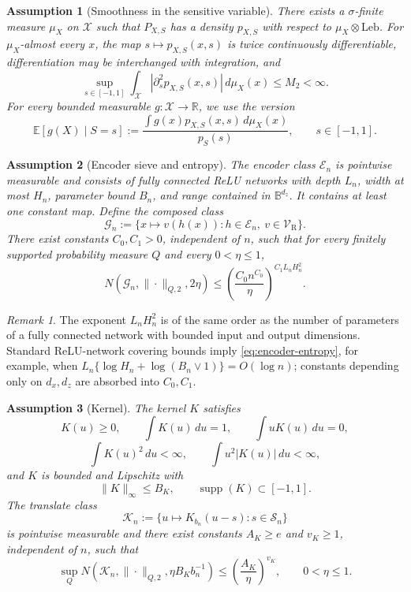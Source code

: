 \documentclass[11pt]{article}
\newtheorem{assumption}{Assumption}[section]
\theoremstyle{remark}
\newtheorem{remark}{Remark}[section]
\newcommand{\R}{\mathbb{R}}
\newcommand{\E}{\mathbb{E}}
\newcommand{\cX}{\mathcal{X}}
\newcommand{\cS}{\mathcal{S}}
\newcommand{\cV}{\mathcal{V}}
\newcommand{\cG}{\mathcal{G}}
\newcommand{\cE}{\mathscr{E}}
\newcommand{\cK}{\mathcal{K}}
\newcommand{\cB}{\mathbb{B}}
\begin{document}
\begin{assumption}[Smoothness in the sensitive variable]
\label{ass:smooth-density}
There exists a $\sigma$-finite measure $\mu_X$ on $\cX$ such that $P_{X,S}$ has
a density $p_{X,S}$ with respect to $\mu_X\otimes\mathrm{Leb}$.  For
$\mu_X$-almost every $x$, the map $s\mapsto p_{X,S}(x,s)$ is twice continuously
differentiable, differentiation may be interchanged with integration, and
\[
  \sup_{s\in[-1,1]}
  \int_{\cX}
  \left|\partial_s^2p_{X,S}(x,s)\right|\,d\mu_X(x)
  \le M_2<\infty.
  \label{eq:density-smoothness}
\]
For every bounded measurable $g:\cX\to\R$, we use the version
\[
  \E[g(X)\mid S=s]
  :=
  \frac{\int g(x)p_{X,S}(x,s)\,d\mu_X(x)}{p_S(s)},
  \qquad s\in[-1,1].
\]
\end{assumption}

\begin{assumption}[Encoder sieve and entropy]
\label{ass:encoder-entropy}
The encoder class $\cE_n$ is pointwise measurable and consists of fully
connected ReLU networks with depth $L_n$, width at most $H_n$, parameter bound
$B_n$, and range contained in $\cB^{d_z}$.  It contains at least one constant
map.  Define the composed class
\[
  \cG_n
  :=
  \{x\mapsto v(h(x)):h\in\cE_n,\ v\in\cV_{\mathrm{R}}\}.
\]
There exist constants $C_0,C_1>0$, independent of $n$, such that for every
finitely supported probability measure $Q$ and every $0<\eta\le1$,
\begin{equation}
  N\!\left(
    \cG_n,\|\cdot\|_{Q,2},2\eta
  \right)
  \le
  \left(\frac{C_0n^{C_0}}{\eta}\right)^{C_1L_nH_n^2}.
  \label{eq:encoder-entropy}
\end{equation}
\end{assumption}

\begin{remark}
The exponent $L_nH_n^2$ is of the same order as the number of parameters of a
fully connected network with bounded input and output dimensions.  Standard
ReLU-network covering bounds imply \eqref{eq:encoder-entropy}, for example, when
$L_n\{\log H_n+\log(B_n\vee1)\}=O(\log n)$; constants depending only on
$d_x,d_z$ are absorbed into $C_0,C_1$.
\end{remark}

\begin{assumption}[Kernel]
\label{ass:kernel}
The kernel $K$ satisfies
\[
  K(u)\ge0,\qquad
  \int K(u)\,du=1,\qquad
  \int uK(u)\,du=0,
\]
\[
  \int K(u)^2\,du<\infty,
  \qquad
  \int u^2|K(u)|\,du<\infty,
\]
and $K$ is bounded and Lipschitz with
\[
  \|K\|_\infty\le B_K,
  \qquad
  \operatorname{supp}(K)\subset[-1,1].
\]
The translate class
\[
  \cK_n:=\{u\mapsto K_{b_n}(u-s):s\in\cS_n\}
\]
is pointwise measurable and there exist constants $A_K\ge e$ and $v_K\ge1$,
independent of $n$, such that
\[
  \sup_Q
  N\!\left(
    \cK_n,\|\cdot\|_{Q,2},\eta B_Kb_n^{-1}
  \right)
  \le
  \left(\frac{A_K}{\eta}\right)^{v_K},
  \qquad 0<\eta\le1.
\]
\end{assumption}
\end{document}
